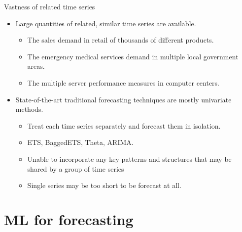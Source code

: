 \documentclass{beamer}
\begin{document}
\begin{frame}{Vastness of related time series}
\begin{itemize}
\item Large quantities of related, similar time series are available.
\vspace{2mm}
\begin{itemize}\color{blue}
\item The sales demand in retail of thousands of different products.
\item The emergency medical services demand in multiple local government areas.
\item The multiple server performance measures in computer centers.
\end{itemize}
\end{itemize}
\begin{itemize}
\item State-of-the-art traditional forecasting techniques are mostly univariate methods.
\vspace{2mm}
\begin{itemize}\color{blue}
\item Treat each time series separately and forecast them in isolation.
\item ETS, BaggedETS, Theta, ARIMA.
\item Unable to incorporate any key patterns and structures that may be shared by a group of time series
\item Single series may be too short to be forecast at all.
\end{itemize}
\end{itemize}

\end{frame}

\section{ML for forecasting}
\end{document}
